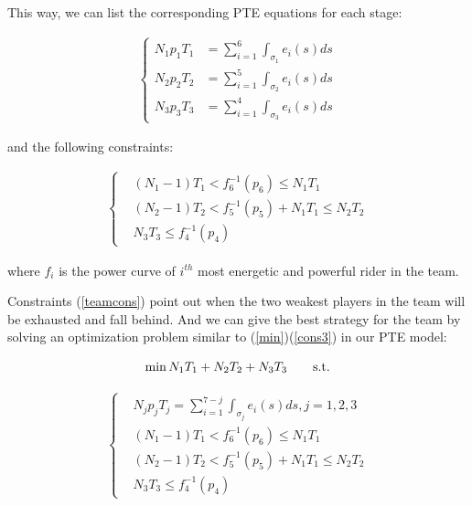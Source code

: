 \par This way, we can list the corresponding PTE equations for each stage: 

\begin{equation}\label{PTEeqs}
	\begin{split}
		\left\{
	\begin{aligned}
	N_1p_1T_1 &=\sum_{i=1}^{6}\int_{\sigma_1}e_i(s)ds  \\
	N_2p_2T_2 &=\sum_{i=1}^{5}\int_{\sigma_2}e_i(s)ds  \\
	N_3p_3T_3 &=\sum_{i=1}^{4}\int_{\sigma_3}e_i(s)ds  
	\end{aligned}
	\right.
\end{split}
\end{equation}

\par and the following constraints:

\begin{equation}\label{teamcons}
\begin{split}
		\left\{
		\begin{aligned}
	&(N_1-1)T_1<f_6^{-1}(p_6)\leq N_1T_1 \\
	&(N_2-1)T_2<f_5^{-1}(p_5)+N_1T_1\leq N_2T_2 \\
	&N_3T_3 \leq f_4^{-1}(p_4)
\end{aligned}
\right.
\end{split}
\end{equation}

\par where $f_i$ is the power curve of $i^{th}$ most energetic and powerful rider in the team.

\par Constraints (\ref{teamcons}) point out when the two weakest players in the team will be exhausted and fall behind. And we can give the best strategy for the team by solving an optimization problem similar to (\ref{min})(\ref{cons3})  in our PTE model:

\begin{equation}
	\min N_1T_1+N_2T_2+N_3T_3 \quad\quad \rm{s.t.}
\end{equation}

\begin{equation}
\begin{split}
	\left\{
	\begin{aligned}
	&N_jp_jT_j =\sum_{i=1}^{7-j}\int_{\sigma_j}e_i(s)ds,j=1,2,3\\
	&(N_1-1)T_1<f_6^{-1}(p_6)\leq N_1T_1 \\
	&(N_2-1)T_2<f_5^{-1}(p_5)+N_1T_1\leq N_2T_2 \\
	&N_3T_3 \leq f_4^{-1}(p_4)
\end{aligned}
		\right.
\end{split}
\end{equation}

